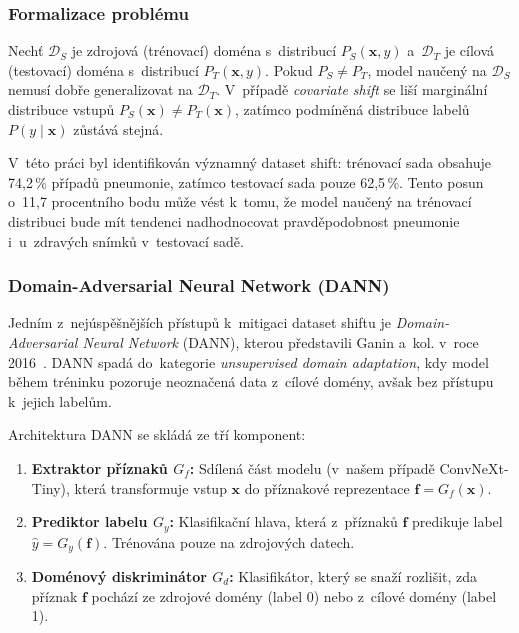 \documentclass[12pt, a4paper]{report}
\begin{document}
\subsubsection{Formalizace problému}

Nechť $\mathcal{D}_S$ je zdrojová (trénovací) doména s~distribucí $P_S(\mathbf{x}, y)$ a~$\mathcal{D}_T$ je cílová (testovací) doména s~distribucí $P_T(\mathbf{x}, y)$. Pokud $P_S \neq P_T$, model naučený na $\mathcal{D}_S$ nemusí dobře generalizovat na $\mathcal{D}_T$. V~případě \textit{covariate shift} se liší marginální distribuce vstupů $P_S(\mathbf{x}) \neq P_T(\mathbf{x})$, zatímco podmíněná distribuce labelů $P(y \mid \mathbf{x})$ zůstává stejná.

V~této práci byl identifikován významný dataset shift: trénovací sada obsahuje 74{,}2\,\% případů pneumonie, zatímco testovací sada pouze 62{,}5\,\%. Tento posun o~11{,}7 procentního bodu může vést k~tomu, že model naučený na trénovací distribuci bude mít tendenci nadhodnocovat pravděpodobnost pneumonie i~u~zdravých snímků v~testovací sadě.

\subsubsection{Domain-Adversarial Neural Network (DANN)}

Jedním z~nejúspěšnějších přístupů k~mitigaci dataset shiftu je \textit{Domain-Adversarial Neural Network} (DANN), kterou představili Ganin a~kol. v~roce 2016~\cite{dann_ganin}. DANN spadá do~kategorie \textit{unsupervised domain adaptation}, kdy model během tréninku pozoruje neoznačená data z~cílové domény, avšak bez přístupu k~jejich labelům.

Architektura DANN se skládá ze tří komponent:
\begin{enumerate}
    \item \textbf{Extraktor příznaků $G_f$:} Sdílená část modelu (v~našem případě ConvNeXt-Tiny), která transformuje vstup $\mathbf{x}$ do příznakové reprezentace $\mathbf{f} = G_f(\mathbf{x})$.
    \item \textbf{Prediktor labelu $G_y$:} Klasifikační hlava, která z~příznaků $\mathbf{f}$ predikuje label $\hat{y} = G_y(\mathbf{f})$. Trénována pouze na zdrojových datech.
    \item \textbf{Doménový diskriminátor $G_d$:} Klasifikátor, který se snaží rozlišit, zda příznak $\mathbf{f}$ pochází ze zdrojové domény (label 0) nebo z~cílové domény (label 1).
\end{enumerate}
\end{document}
